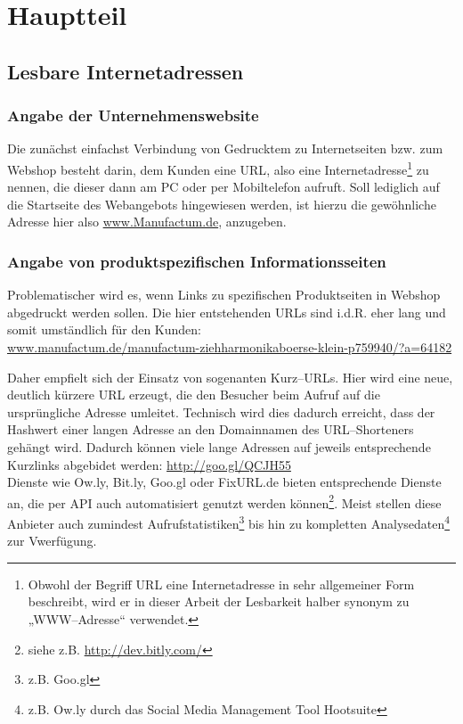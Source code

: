 \section{Hauptteil}
\label{sec:hauptteil}

\subsection{Lesbare Internetadressen}

\subsubsection{Angabe der Unternehmenswebsite}

Die zunächst einfachst Verbindung von Gedrucktem zu Internetseiten bzw. zum Webshop besteht darin, dem Kunden eine \ac{URL}, also eine Internetadresse\footnote{Obwohl der Begriff URL eine Internetadresse in sehr allgemeiner Form beschreibt, wird er in dieser Arbeit der Lesbarkeit halber synonym zu „WWW--Adresse“ verwendet.} zu nennen, die dieser dann am PC oder per Mobiltelefon aufruft.
Soll lediglich auf die Startseite des Webangebots hingewiesen werden, ist hierzu die gewöhnliche Adresse hier also \url{www.Manufactum.de}, anzugeben. 

\subsubsection{Angabe von produktspezifischen Informationsseiten}

Problematischer wird es, wenn Links zu spezifischen Produktseiten in Webshop abgedruckt werden sollen. Die hier entstehenden \ac{URL}s sind i.d.R. eher lang und somit umständlich für den Kunden:\\ \url{www.manufactum.de/manufactum-ziehharmonikaboerse-klein-p759940/?a=64182}

Daher empfielt sich der Einsatz von sogenanten Kurz--URLs. Hier wird eine neue, deutlich kürzere \ac{URL} erzeugt, die den Besucher beim Aufruf auf die ursprüngliche Adresse umleitet. Technisch wird dies dadurch erreicht, dass der Hashwert einer langen Adresse an den Domainnamen des URL--Shorteners gehängt wird. Dadurch können viele lange Adressen auf jeweils
entsprechende Kurzlinks abgebidet werden: \url{http://goo.gl/QCJH55}\\
Dienste wie Ow.ly, Bit.ly, Goo.gl oder FixURL.de bieten entsprechende Dienste an, die per \ac{API} auch automatisiert genutzt werden können\footnote{siehe z.B. \url{http://dev.bitly.com/}}. Meist stellen diese Anbieter auch zumindest Aufrufstatistiken\footnote{z.B. Goo.gl} bis hin zu kompletten Analysedaten\footnote{z.B. Ow.ly durch das Social Media Management Tool Hootsuite} zur Vwerfügung.

